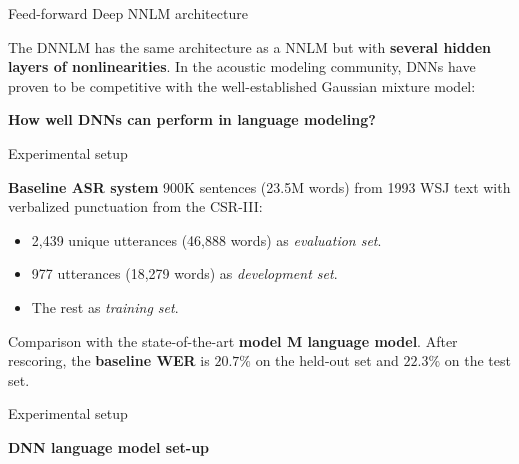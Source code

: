 \documentclass{beamer}
\begin{document}
\begin{frame}{Feed-forward Deep NNLM architecture}

The DNNLM has the same architecture as a NNLM but with \textbf{several hidden layers of nonlinearities}.
\newline
\newline
In the acoustic modeling community, DNNs have proven to be competitive with the well-established Gaussian mixture model:
\newline
\begin{center}
\textbf{How well DNNs can perform in language modeling?}
\end{center}

\end{frame}


\begin{frame}{Experimental setup}

\textbf{Baseline ASR system}
\newline
\newline
900K sentences (23.5M words) from 1993 WSJ text with verbalized punctuation from the CSR-III: \\
\begin{itemize}
    \item 2,439 unique utterances (46,888 words) as \textit{evaluation set}.
    \item 977 utterances (18,279 words) as \textit{development set}.
    \item The rest as \textit{training set}.\\
\end{itemize}

Comparison with the state-of-the-art \textbf{model M language model}.
\newline
\newline
After rescoring, the \textbf{baseline WER} is $20.7\%$ on the held-out set and $22.3\%$ on the test set.

\end{frame}

\begin{frame}{Experimental setup}

\textbf{DNN language model set-up}
\newline
\newline

\end{frame}
\end{document}
